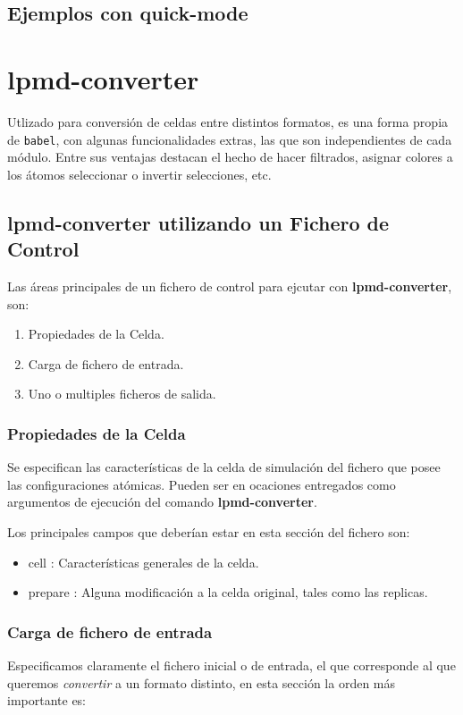 \subsection{Ejemplos con quick-mode}

\section{lpmd-converter}

Utlizado para conversi\'on de celdas entre distintos formatos, es una forma propia de \verb|babel|, con algunas funcionalidades extras, las que son independientes de cada m\'odulo. Entre sus ventajas destacan el hecho de hacer filtrados, asignar colores a los \'atomos seleccionar o invertir selecciones, etc.

\subsection{lpmd-converter utilizando un Fichero de Control}
Las \'areas principales de un fichero de control para ejcutar con \textbf{lpmd-converter}, son:

\begin{enumerate}
 \item Propiedades de la Celda.
 \item Carga de fichero de entrada.
 \item Uno o multiples ficheros de salida.
\end{enumerate}

\subsubsection{Propiedades de la Celda}
Se especifican las caracter\'isticas de la celda de simulaci\'on del fichero que posee las configuraciones at\'omicas. Pueden ser en ocaciones entregados como argumentos de ejecuci\'on del comando \textbf{lpmd-converter}.

Los principales campos que deber\'ian estar en esta secci\'on del fichero son:
\begin{itemize}
 \item cell : Caracter\'isticas generales de la celda.
 \item prepare : Alguna modificaci\'on a la celda original, tales como las replicas.
\end{itemize}
\subsubsection{Carga de fichero de entrada}
Especificamos claramente el fichero inicial o de entrada, el que corresponde al que queremos \textit{convertir} a un formato distinto, en esta secci\'on la orden m\'as importante es:

